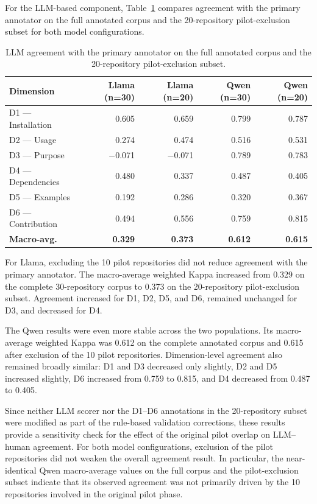 For the LLM-based component, Table~\ref{tab:llm_pilot_exclusion}
compares agreement with the primary annotator on the full annotated
corpus and the 20-repository pilot-exclusion subset for both model
configurations.

\begin{table}[htbp]
\centering
\caption{LLM agreement with the primary annotator on the full
annotated corpus and the 20-repository pilot-exclusion subset.}
\label{tab:llm_pilot_exclusion}
\small
\begin{tabular}{lrrrr}
\hline
\textbf{Dimension}
& \textbf{Llama (n=30)}
& \textbf{Llama (n=20)}
& \textbf{Qwen (n=30)}
& \textbf{Qwen (n=20)} \\
\hline
D1 --- Installation
& 0.605 & 0.659 & 0.799 & 0.787 \\
D2 --- Usage
& 0.274 & 0.474 & 0.516 & 0.531 \\
D3 --- Purpose
& $-$0.071 & $-$0.071 & 0.789 & 0.783 \\
D4 --- Dependencies
& 0.480 & 0.337 & 0.487 & 0.405 \\
D5 --- Examples
& 0.192 & 0.286 & 0.320 & 0.367 \\
D6 --- Contribution
& 0.494 & 0.556 & 0.759 & 0.815 \\
\hline
\textbf{Macro-avg.}
& \textbf{0.329}
& \textbf{0.373}
& \textbf{0.612}
& \textbf{0.615} \\
\hline
\end{tabular}
\end{table}

For Llama, excluding the 10 pilot repositories did not reduce
agreement with the primary annotator. The macro-average weighted
Kappa increased from 0.329 on the complete 30-repository corpus to
0.373 on the 20-repository pilot-exclusion subset. Agreement increased
for D1, D2, D5, and D6, remained unchanged for D3, and decreased for
D4.

The Qwen results were even more stable across the two populations.
Its macro-average weighted Kappa was 0.612 on the complete annotated
corpus and 0.615 after exclusion of the 10 pilot repositories.
Dimension-level agreement also remained broadly similar: D1 and D3
decreased only slightly, D2 and D5 increased slightly, D6 increased
from 0.759 to 0.815, and D4 decreased from 0.487 to 0.405.

Since neither LLM scorer nor the D1--D6 annotations in the
20-repository subset were modified as part of the rule-based
validation corrections, these results provide a sensitivity check
for the effect of the original pilot overlap on LLM--human agreement.
For both model configurations, exclusion of the pilot repositories
did not weaken the overall agreement result. In particular, the
near-identical Qwen macro-average values on the full corpus and the
pilot-exclusion subset indicate that its observed agreement was not
primarily driven by the 10 repositories involved in the original
pilot phase.

